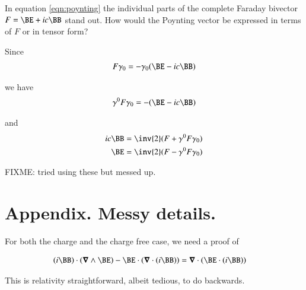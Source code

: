 \documentclass{article}
\begin{document}
In equation \ref{eqn:poynting} the individual parts of the complete Faraday
bivector $F = \BE + i c \BB$ stand out.  How would the Poynting vector be
expressed in terms of $F$ or in tensor form?

Since
\begin{align*}
F \gamma_0 = - \gamma_0(\BE - i c \BB)
\end{align*}

we have
\begin{align*}
\gamma^0 F \gamma_0 = - (\BE - i c \BB)
\end{align*}

and
\begin{align*}
i c \BB &= \inv{2}(F + \gamma^0 F \gamma_0) \\
\BE &= \inv{2}(F - \gamma^0 F \gamma_0) \\
\end{align*}

FIXME: tried using these but messed up.

%
%

\section{ Appendix.  Messy details. }

For both the charge and the charge free case, we need a proof of 

\begin{align*}
(i\BB) \cdot (\spacegrad \wedge \BE) - \BE \cdot (\spacegrad \cdot (i \BB)) 
&= \spacegrad \cdot (\BE \cdot (i\BB)) 
\end{align*}

This is relativity straightforward, albeit tedious, to do backwards.
\end{document}
